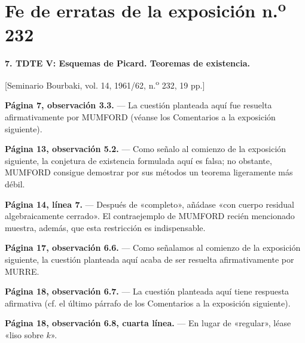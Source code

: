 \clearpage
\chapter*{Fe de erratas de la exposición n.\textsuperscript{o} 232}

\noindent\textbf{7. TDTE V: Esquemas de Picard. Teoremas de existencia.}

\begin{center}
[Seminario Bourbaki, vol. 14, 1961/62, n.\textsuperscript{o} 232, 19 pp.]
\end{center}

\noindent\textbf{Página 7, observación 3.3.} --- La cuestión planteada aquí fue
resuelta afirmativamente por MUMFORD (véanse los Comentarios a la exposición
siguiente).

\noindent\textbf{Página 13, observación 5.2.} --- Como señalo al comienzo de la
exposición siguiente, la conjetura de existencia formulada aquí es falsa; no
obstante, MUMFORD consigue demostrar por sus métodos un teorema ligeramente más
débil.

\noindent\textbf{Página 14, línea 7.} --- Después de «completo», añádase «con
cuerpo residual algebraicamente cerrado». El contraejemplo de MUMFORD recién
mencionado muestra, además, que esta restricción es indispensable.

\noindent\textbf{Página 17, observación 6.6.} --- Como señalamos al comienzo de
la exposición siguiente, la cuestión planteada aquí acaba de ser resuelta
afirmativamente por MURRE.

\noindent\textbf{Página 18, observación 6.7.} --- La cuestión planteada aquí
tiene respuesta afirmativa (cf. el último párrafo de los Comentarios a la
exposición siguiente).

\noindent\textbf{Página 18, observación 6.8, cuarta línea.} --- En lugar de
«regular», léase «liso sobre $k$».
